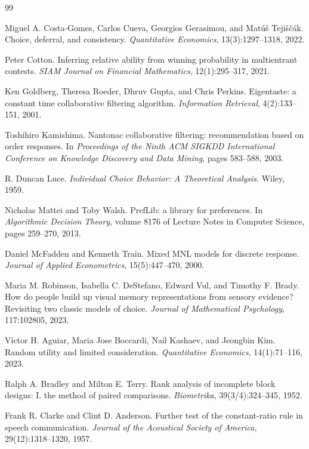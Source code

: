 \documentclass[11pt]{article}
\theoremstyle{italichead}
\begin{document}
\begin{thebibliography}{99}

Miguel A. Costa-Gomes, Carlos Cueva, Georgios Gerasimou, and Mat\'u\v{s}
Teji\v{s}\v{c}\'ak.
Choice, deferral, and consistency.
\emph{Quantitative Economics}, 13(3):1297--1318, 2022.

Peter Cotton.
Inferring relative ability from winning probability in multientrant contests.
\emph{SIAM Journal on Financial Mathematics}, 12(1):295--317, 2021.

Ken Goldberg, Theresa Roeder, Dhruv Gupta, and Chris Perkins.
Eigentaste: a constant time collaborative filtering algorithm.
\emph{Information Retrieval}, 4(2):133--151, 2001.

Toshihiro Kamishima.
Nantonac collaborative filtering: recommendation based on order responses.
In \emph{Proceedings of the Ninth ACM SIGKDD International Conference on Knowledge
Discovery and Data Mining}, pages 583--588, 2003.

R. Duncan Luce.
\emph{Individual Choice Behavior: A Theoretical Analysis}.
Wiley, 1959.

Nicholas Mattei and Toby Walsh.
PrefLib: a library for preferences.
In \emph{Algorithmic Decision Theory}, volume 8176 of Lecture Notes in Computer Science,
pages 259--270, 2013.

Daniel McFadden and Kenneth Train.
Mixed MNL models for discrete response.
\emph{Journal of Applied Econometrics}, 15(5):447--470, 2000.

Maria M. Robinson, Isabella C. DeStefano, Edward Vul, and Timothy F. Brady.
How do people build up visual memory representations from sensory evidence?
Revisiting two classic models of choice.
\emph{Journal of Mathematical Psychology}, 117:102805, 2023.

Victor H. Aguiar, Maria Jose Boccardi, Nail Kashaev, and Jeongbin Kim.
Random utility and limited consideration.
\emph{Quantitative Economics}, 14(1):71--116, 2023.

Ralph A. Bradley and Milton E. Terry.
Rank analysis of incomplete block designs: I. the method of paired comparisons.
\emph{Biometrika}, 39(3/4):324--345, 1952.

Frank R. Clarke and Clint D. Anderson.
Further test of the constant-ratio rule in speech communication.
\emph{Journal of the Acoustical Society of America}, 29(12):1318--1320, 1957.


\end{thebibliography}
\end{document}
